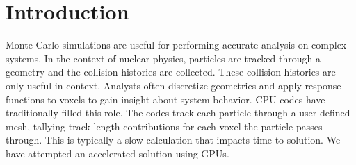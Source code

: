 
\section{Introduction}
    Monte Carlo simulations are useful for performing accurate analysis on complex
systems. In the context of nuclear physics, particles are tracked through a
geometry and the collision histories are collected. These collision histories
are only useful in context. Analysts often discretize geometries and apply response functions to voxels to gain insight about system behavior. CPU codes have traditionally
filled this role. The codes track each particle through a user-defined mesh,
tallying track-length contributions for each voxel the particle passes through.
This is typically a slow calculation that impacts time to solution. We have
attempted an accelerated solution using GPUs.
